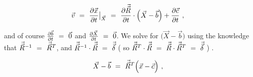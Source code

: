 \documentclass{article}
\begin{document}
\begin{equation} \label{eq:1}
\vec{v} \hspace{0.125cm} = \hspace{0.125cm} \frac{\partial{\vec{x}}}{\partial{t}} \big|_{\vec{X}} \hspace{0.125cm} = \hspace{0.125cm} \frac{\partial{\vec{\vec{R}}}}{\partial{t}} \cdot \Big( \vec{X} - \vec{b} \Big) + \frac{\partial{\vec{c}}}{\partial{t}} \hspace{0.125cm}  ,  \hspace{0.125cm} 
\end{equation}

and of course \begin{math} \frac{\partial{\vec{b}}}{\partial{t}} \hspace{0.125cm} = \hspace{0.125cm} \vec{0} \end{math} and \begin{math} \frac{\partial{\vec{X}}}{\partial{t}} \hspace{0.125cm} = \hspace{0.125cm} \vec{0} \end{math}. We solve for \begin{math} \Big( \vec{X} - \vec{b} \Big) \end{math} using the knowledge that \begin{math} \vec{\vec{R}}^{-1} \hspace{0.125cm} = \hspace{0.125cm} \vec{\vec{R}}^{T} \end{math}, and \begin{math} \vec{\vec{R}}^{-1} \cdot \vec{\vec{R}} \hspace{0.125cm} = \hspace{0.125cm} \vec{\vec{\delta}} \end{math} ( so \begin{math} \vec{\vec{R}}^{T} \cdot \vec{\vec{R}} \hspace{0.125cm} = \hspace{0.125cm} \vec{\vec{R}} \cdot \vec{\vec{R}}^{T} \hspace{0.125cm} = \hspace{0.125cm} \vec{\vec{\delta}} \end{math} ) .

\begin{equation} \label{eq:1}
\vec{X} - \vec{b}  \hspace{0.125cm} = \hspace{0.125cm} \vec{\vec{R}}^{T} \Big( \vec{x} - \vec{c} \Big)  \hspace{0.125cm}  ,  \hspace{0.125cm} 
\end{equation}
\end{document}
